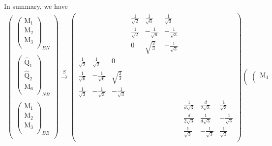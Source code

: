 \documentclass[12pt,a4paper]{article}
\newcounter{arrow}
\begin{document}
In summary, we have
\begin{align}
\left(\begin{matrix}
\left( \begin{matrix}
\text{M}_1\\
\text{M}_2\\
\text{M}_3\\
\end{matrix} \right)_{BN} \\
\\
\left( \begin{matrix}
\widehat{\text{Q}}_1\\
\widehat{\text{Q}}_2\\
\text{M}_6\\
\end{matrix} \right)_{NB}\\
\\
\left( \begin{matrix}
\text{M}_1\\
\text{M}_2\\
\text{M}_3\\
\end{matrix} \right)_{BB} \\
\end{matrix} \right)
\xrightarrow{S} \left( \begin{matrix}
&&&			\frac{1}{\sqrt{2}} & \frac{1}{\sqrt{6}} &  \frac{1}{\sqrt{3}} &			&&\\
&&&			\frac{1}{\sqrt{2}} & - \frac{1}{\sqrt{6}} & -\frac{1}{\sqrt{3}}& 			&&\\
&&&			0& \sqrt{\frac{2}{3}} & -\frac{1}{\sqrt{3}}& 			&&\\
\frac{1}{\sqrt{2}}& \frac{1}{\sqrt{2}}& 0&			&&& 			&&\\
\frac{1}{\sqrt{6}} & - \frac{1}{\sqrt{6}} & \sqrt{\frac{2}{3}}&			&&& 			&&\\
\frac{1}{\sqrt{3}} & - \frac{1}{\sqrt{3}} & - \frac{1}{\sqrt{3}}&			&&& 			&&\\
&&&			&&&			\frac{1}{d\sqrt{3}} & \frac{d}{2\sqrt{3}} & \frac{1}{\sqrt{3}}\\
&&&			&&& 			\frac{d}{2\sqrt{3}} & \frac{1}{d\sqrt{3}} & -\frac{1}{\sqrt{3}}\\
&&&			&&& 			\frac{1}{\sqrt{3}} & -\frac{1}{\sqrt{3}} & \frac{1}{\sqrt{3}}\\
\end{matrix} \right)
\left(\begin{matrix}
\left( \begin{matrix}
\text{M}_1\\

\end{matrix}
\end{matrix}
\end{align}
\end{document}
